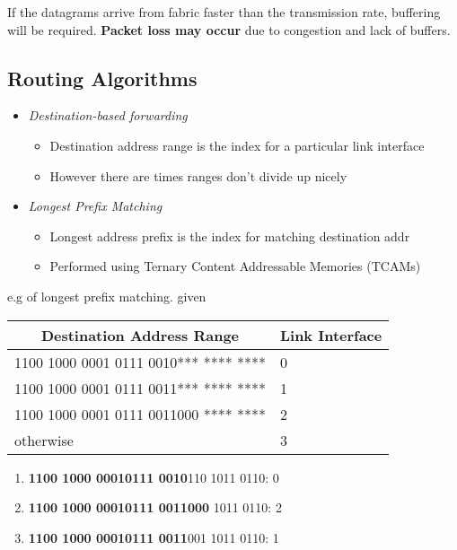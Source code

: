 \documentclass[a4paper]{article}
\begin{document}
\bigskip

\noindent If the datagrams arrive from fabric faster than the transmission rate, buffering will be required. \textbf{Packet loss may occur} due to congestion and lack of buffers.
\subsection{Routing Algorithms}
\label{routealgo}
\begin{itemize}
    \item \textit{Destination-based forwarding}
    \begin{itemize}[label=$\circ$]
        \item Destination address range is the index for a particular link interface
        \item However there are times ranges don't divide up nicely
    \end{itemize}
    \item \textit{Longest Prefix Matching}
    \begin{itemize}[label=$\circ$]
        \item Longest address prefix is the index for matching destination addr
        \item Performed using Ternary Content Addressable Memories (TCAMs)
    \end{itemize}
\end{itemize}
e.g of longest prefix matching. given
\begin{table}[H]
    \centering
    \begin{tabular}{|l|l|}
    \hline
    \multicolumn{1}{|c|}{\textbf{Destination Address Range}} & \multicolumn{1}{c|}{\textbf{Link Interface}} \\ \hline
    1100 1000 0001 0111 0010*** **** ****                    & 0                                            \\ \hline
    1100 1000 0001 0111 0011*** **** ****                    & 1                                            \\ \hline
    1100 1000 0001 0111 0011000 **** ****                    & 2                                            \\ \hline
    otherwise                                                & 3                                            \\ \hline
    \end{tabular}
\end{table}
\begin{enumerate}[label=\alph*)]
    \item \textbf{1100 1000 00010111 0010}110 1011 0110: 0
    \item \textbf{1100 1000 00010111 0011000} 1011 0110: 2
    \item \textbf{1100 1000 00010111 0011}001 1011 0110: 1
\end{enumerate}
\end{document}
